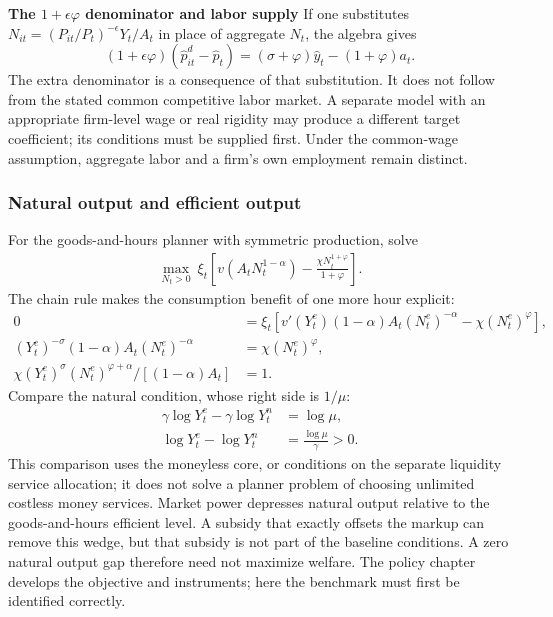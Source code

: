 \begin{blueblock}
\textbf{The $1+\epsilon\varphi$ denominator and labor supply}
If one substitutes $N_{it}=(P_{it}/P_t)^{-\epsilon}Y_t/A_t$ in place of
aggregate $N_t$, the algebra gives
\[
 (1+\epsilon\varphi)(\hat p_{it}^d-\hat p_t)
       =(\sigma+\varphi)\hat y_t-(1+\varphi)a_t.
\]
The extra denominator is a consequence of that substitution. It does not follow
from the stated common competitive labor market. A separate model with an
appropriate firm-level wage or real rigidity may produce a different target
coefficient; its conditions must be supplied first. Under the common-wage
assumption, aggregate labor and a firm's own employment remain distinct.
\end{blueblock}

\subsubsection{Natural output and efficient output}

For the goods-and-hours planner with symmetric production, solve
\begin{align}
 \max_{N_t>0}\ \xi_t\left[
 v(A_tN_t^{1-\alpha})-\frac{\chi N_t^{1+\varphi}}{1+\varphi}\right].
\end{align}
The chain rule makes the consumption benefit of one more hour explicit:
\begin{align}
 0&=\xi_t\left[v'(Y_t^e)(1-\alpha)A_t(N_t^e)^{-\alpha}
                                    -\chi(N_t^e)^\varphi\right],\\
 (Y_t^e)^{-\sigma}(1-\alpha)A_t(N_t^e)^{-\alpha}
 &=\chi(N_t^e)^\varphi,\\
 \chi(Y_t^e)^\sigma(N_t^e)^{\varphi+\alpha}/[(1-\alpha)A_t]&=1.
\end{align}
Compare the natural condition, whose right side is $1/\mu$:
\begin{align}
 \gamma\log Y_t^e-\gamma\log Y_t^n&=\log\mu,\\
 \log Y_t^e-\log Y_t^n&=\frac{\log\mu}{\gamma}>0.
\end{align}
This comparison uses the moneyless core, or conditions on the separate liquidity
service allocation; it does not solve a planner problem of choosing unlimited
costless money services. Market power depresses natural output relative to the
goods-and-hours efficient level. A subsidy that exactly offsets the markup can
remove this wedge, but that subsidy is not part of the baseline conditions.
A zero natural output gap therefore need not maximize welfare. The policy
chapter develops the objective and instruments; here the benchmark must first
be identified correctly.

